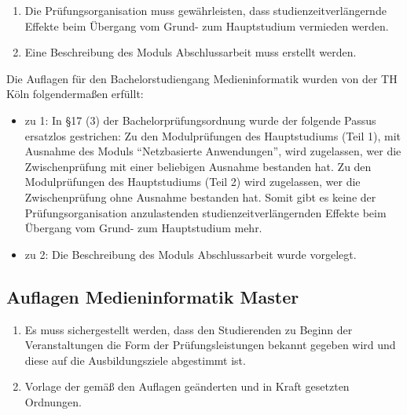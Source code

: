 \begin{siderules}
\begin{enumerate}
\def\labelenumi{\arabic{enumi}.}
\tightlist
\item
  Die Prüfungsorganisation muss gewährleisten, dass
  studienzeitverlängernde Effekte beim Übergang vom Grund- zum
  Hauptstudium vermieden werden.
\item
  Eine Beschreibung des Moduls Abschlussarbeit muss erstellt werden.
\end{enumerate}
\end{siderules}

Die Auflagen für den Bachelorstudiengang Medieninformatik wurden von der
TH Köln folgendermaßen erfüllt:

\begin{itemize}
\tightlist
\item
  zu 1: In §17 (3) der Bachelorprüfungsordnung wurde der folgende Passus
  ersatzlos gestrichen: Zu den Modulprüfungen des Hauptstudiums (Teil
  1), mit Ausnahme des Moduls ``Netzbasierte Anwendungen'', wird
  zugelassen, wer die Zwischenprüfung mit einer beliebigen Ausnahme
  bestanden hat. Zu den Modulprüfungen des Hauptstudiums (Teil 2) wird
  zugelassen, wer die Zwischenprüfung ohne Ausnahme bestanden hat. Somit
  gibt es keine der Prüfungsorganisation anzulastenden
  studienzeitverlängernden Effekte beim Übergang vom Grund- zum
  Hauptstudium mehr.
\item
  zu 2: Die Beschreibung des Moduls Abschlussarbeit wurde vorgelegt.
\end{itemize}

\subsection{Auflagen Medieninformatik
Master\label{/mi-2017/selbstbericht/0100-ist-zustand/0100-ist-zustand}}\label{auflagen-medieninformatik-masterpathlabelmi-2017selbstbericht0100-ist-zustand0100-ist-zustand}

\begin{siderules}
\begin{enumerate}
\def\labelenumi{\arabic{enumi}.}
\tightlist
\item
  Es muss sichergestellt werden, dass den Studierenden zu Beginn der
  Veranstaltungen die Form der Prüfungsleistungen bekannt gegeben wird
  und diese auf die Ausbildungsziele abgestimmt ist.
\item
  Vorlage der gemäß den Auflagen geänderten und in Kraft gesetzten
  Ordnungen.
\end{enumerate}
\end{siderules}

